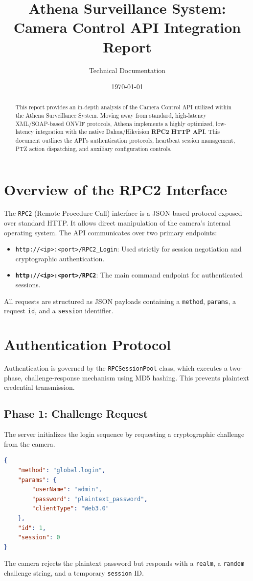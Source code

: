 \documentclass[12pt,a4paper]{article}
\title{\textbf{Athena Surveillance System: Camera Control API Integration Report}}
\author{Technical Documentation}
\date{\today}
\begin{document}
\maketitle

\begin{abstract}
This report provides an in-depth analysis of the Camera Control API utilized within the Athena Surveillance System. Moving away from standard, high-latency XML/SOAP-based ONVIF protocols, Athena implements a highly optimized, low-latency integration with the native Dahua/Hikvision \textbf{RPC2 HTTP API}. This document outlines the API's authentication protocols, heartbeat session management, PTZ action dispatching, and auxiliary configuration controls.
\end{abstract}

\section{Overview of the RPC2 Interface}
The \texttt{RPC2} (Remote Procedure Call) interface is a JSON-based protocol exposed over standard HTTP. It allows direct manipulation of the camera's internal operating system. The API communicates over two primary endpoints:
\begin{itemize}
    \item \texttt{http://<ip>:<port>/RPC2\_Login}: Used strictly for session negotiation and cryptographic authentication.
    \item \textbf{\texttt{http://<ip>:<port>/RPC2}}: The main command endpoint for authenticated sessions.
\end{itemize}
All requests are structured as JSON payloads containing a \texttt{method}, \texttt{params}, a request \texttt{id}, and a \texttt{session} identifier.

\section{Authentication Protocol}
Authentication is governed by the \texttt{RPCSessionPool} class, which executes a two-phase, challenge-response mechanism using MD5 hashing. This prevents plaintext credential transmission.

\subsection{Phase 1: Challenge Request}
The server initializes the login sequence by requesting a cryptographic challenge from the camera.
\begin{lstlisting}[style=jsonstyle, language=json, caption=Phase 1 Request]
{
    "method": "global.login",
    "params": {
        "userName": "admin",
        "password": "plaintext_password",
        "clientType": "Web3.0"
    },
    "id": 1,
    "session": 0
}
\end{lstlisting}
The camera rejects the plaintext password but responds with a \texttt{realm}, a \texttt{random} challenge string, and a temporary \texttt{session} ID.
\end{document}
